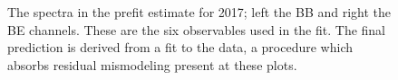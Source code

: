 \begin{figure}[!htbp]{
\caption{The \mgg spectra in the prefit estimate for 2017; left the BB and right the BE channels.
These are the six observables used in the fit.
The final prediction is derived from a fit to the data, a procedure which absorbs residual mismodeling present at these plots.
}
\label{fig:Prefit_spectra2017}}
\end{figure}

